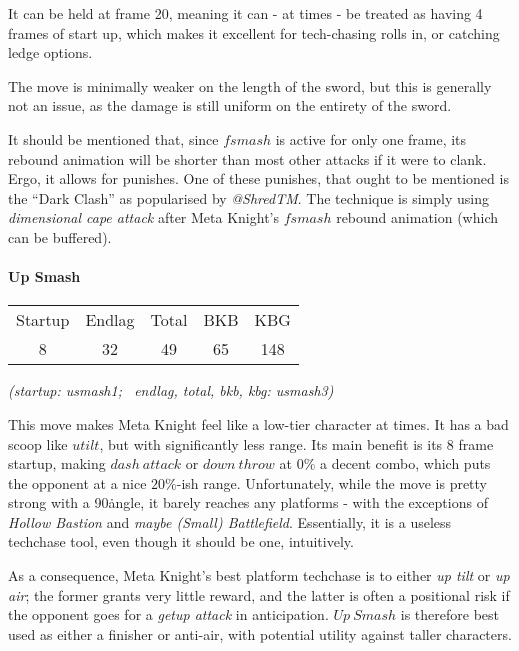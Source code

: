 It can be held at frame 20, meaning it can - at times - be treated as having 4 frames of start up, which makes it excellent for tech-chasing rolls in, or catching ledge options.

The move is minimally weaker on the length of the sword, but this is generally not an issue, as the damage is still uniform on the entirety of the sword.

It should be mentioned that, since $fsmash$ is active for only one frame, its rebound animation will be shorter than most other attacks if it were to clank. Ergo, it allows for punishes. One of these punishes, that ought to be mentioned is the ``Dark Clash'' as popularised by \textit{@ShredTM}. The technique is simply using \textit{dimensional cape attack} after Meta Knight's $fsmash$ rebound animation (which can be buffered).

\paragraph{Up Smash}
\begin{center}
	\begin{tabular}{| c  c  c | c  c |}
		\hline
		Startup	& Endlag & Total & BKB & KBG  \\
		8		&	32	&	49	&	65	&	148	 \\
		\hline
	\end{tabular}
	
	\emph{(startup: usmash1; \ endlag, total, bkb, kbg: usmash3)}
\end{center}
This move makes Meta Knight feel like a low-tier character at times. It has a bad scoop like $utilt$, but with significantly less range. Its main benefit is its 8 frame startup, making $dash\ attack$ or $down\ throw$ at $0\%$ a decent combo, which puts the opponent at a nice $20\%$-ish range. Unfortunately, while the move is pretty strong with a 90\deg\. angle, it barely reaches any platforms - with the exceptions of \textit{Hollow Bastion} and \textit{maybe (Small) Battlefield}. Essentially, it is a useless techchase tool, even though it should be one, intuitively.

As a consequence, Meta Knight's best platform techchase is to either \textit{up tilt} or \textit{up air}; the former grants very little reward, and the latter is often a positional risk if the opponent goes for a \textit{getup attack} in anticipation. $Up\ Smash$ is therefore best used as either a finisher or anti-air, with potential utility against taller characters.


